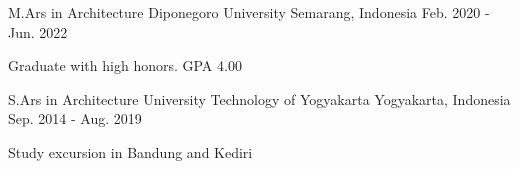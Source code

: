 

\begin{cventries}

  \cventry
    {M.Ars in Architecture} %
    {Diponegoro University} %
    {Semarang, Indonesia} %
    {Feb. 2020 - Jun. 2022} %
    {
      \begin{cvitems} %
        \item {Graduate with high honors. GPA 4.00 }
      \end{cvitems}
    }

  \cventry
    {S.Ars in Architecture} %
    {University Technology of Yogyakarta} %
    {Yogyakarta, Indonesia} %
    {Sep. 2014 - Aug. 2019} %
    {
      \begin{cvitems} %
        \item {Study excursion in Bandung and Kediri}
      \end{cvitems}
    }
\end{cventries}
